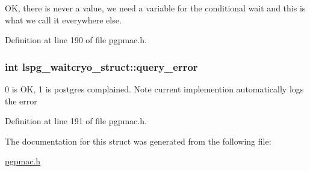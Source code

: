 O\-K, there is never a value, we need a variable for the conditional wait and this is what we call it everywhere else. 



Definition at line 190 of file pgpmac.\-h.

\hypertarget{structlspg__waitcryo__struct_a562f641a86142566aa67dc41f2676fb7}{
\subsubsection[{query\-\_\-error}]{\setlength{\rightskip}{0pt plus 5cm}int lspg\-\_\-waitcryo\-\_\-struct\-::query\-\_\-error}}\label{structlspg__waitcryo__struct_a562f641a86142566aa67dc41f2676fb7}


0 is O\-K, 1 is postgres complained. Note current implemention automatically logs the error 



Definition at line 191 of file pgpmac.\-h.



The documentation for this struct was generated from the following file\-:\begin{DoxyCompactItemize}
\item 
\hyperlink{pgpmac_8h}{pgpmac.\-h}\end{DoxyCompactItemize}
